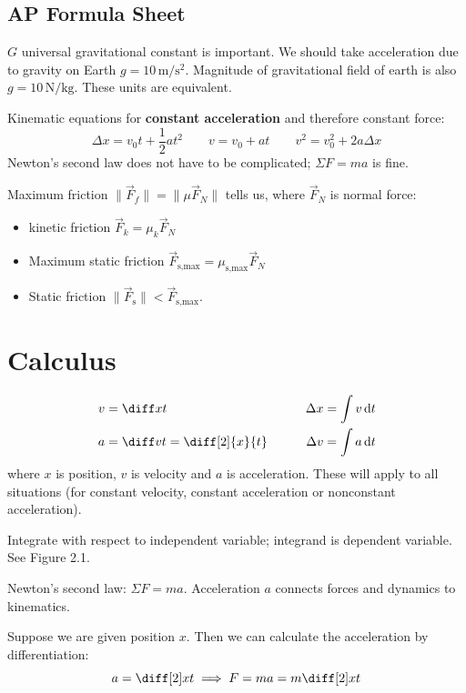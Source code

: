 \documentclass{article}
\newcommand{\theorem}[2]{\begin{tcolorbox}[title={#1},colback=blue!5!white,colframe=blue!75!black,parbox=false] #2 \end{tcolorbox}}
\begin{document}
\subsection{AP Formula Sheet}

$G$ universal gravitational constant is important. We should take acceleration due to gravity on Earth $g=10\,\si{\meter\per\second\squared}$. Magnitude of gravitational field of earth is also $g=10\,\si{\newton\per\kilo\gram}$. These units are equivalent.

Kinematic equations for \textbf{constant acceleration} and therefore constant force:
\begin{equation*}
    \Delta x=v_0t+\frac12at^2 \qquad
	v=v_0+at \qquad
	v^2=v_0^2+2a\Delta x
\end{equation*}
Newton's second law does not have to be complicated; $\Sigma F=ma$ is fine.

Maximum friction $\lVert \vec{F}_f \rVert =\lVert \mu \vec{F}_N \rVert $ tells us, where $\vec{F}_N$ is normal force:
\begin{itemize}
	\item kinetic friction $\vec{F}_k=\mu_k \vec{F}_N$
	\item Maximum static friction $\vec{F}_\text{s,max}=\mu_\text{s,max}\vec{F}_N$
	\item Static friction $\lVert \vec{F}_\text{s} \rVert <\vec{F}_\text{s,max}$.
\end{itemize}

\section{Calculus}

\theorem{Kinematics}{
	\begin{alignat*}{2}
		v&=\diff xt &\qquad \Delta x=\int v\,\mathrm{d}t \\
		a&=\diff vt=\diff[2]{x}{t} &\qquad \Delta v=\int a\,\mathrm{d}t
	\end{alignat*}
	where $x$ is position, $v$ is velocity and $a$ is acceleration. These will apply to all situations (for constant velocity, constant acceleration or nonconstant acceleration).
}

Integrate with respect to independent variable; integrand is dependent variable. See Figure 2.1.

\theorem{Connecting dynamics/forces and kinematics}{
Newton's second law: $\Sigma F=ma$. Acceleration $a$ connects forces and dynamics to kinematics.

Suppose we are given position $x$. Then we can calculate the acceleration by differentiation:
\begin{equation*}
	a=\diff[2]xt
	\implies F=ma=m\diff[2]xt
\end{equation*}
}
\end{document}
